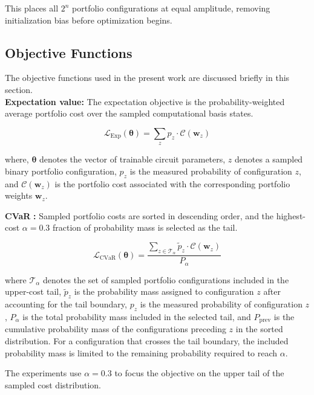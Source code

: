 \documentclass[runningheads]{llncs}
\begin{document}
This places all $2^n$ portfolio configurations at equal amplitude, removing initialization bias before optimization begins.

\subsection{Objective Functions}
The objective functions used in the present work are discussed briefly in this section.\\
\textbf{Expectation value:} The expectation objective is the probability-weighted average portfolio cost over the sampled computational basis states.

\begin{equation}
    \mathcal{L}_{\text{Exp}}(\boldsymbol{\theta}) = 
    \sum_{z} p_z \cdot \mathcal{C}(\mathbf{w}_z)
\end{equation}

where, $\boldsymbol{\theta}$ denotes the vector of trainable circuit parameters, $z$ denotes a sampled binary portfolio configuration, $p_z$ is the measured probability of configuration $z$, and $\mathcal{C}(\mathbf{w}_z)$ is the portfolio cost associated with the corresponding portfolio weights $\mathbf{w}_z$.

\textbf{CVaR} \cite{barkoutsos2020}\textbf{:} Sampled portfolio costs are sorted in descending order, and the highest-cost $\alpha = 0.3$ fraction of probability mass is selected as the tail.

\begin{equation}
    \mathcal{L}_{\text{CVaR}}(\boldsymbol{\theta}) = 
    \frac{\displaystyle\sum_{z \in \mathcal{T}_\alpha} 
    \tilde{p}_z \cdot \mathcal{C}(\mathbf{w}_z)}{P_\alpha}
\end{equation}

where $\mathcal{T}_\alpha$ denotes the set of sampled portfolio configurations included in the upper-cost tail, $\tilde{p}_z$ is the probability mass assigned to configuration $z$ after accounting for the tail boundary, $p_z$ is the measured probability of configuration $z$, $P_\alpha$ is the total probability mass included in the selected tail, and $P_{\mathrm{prev}}$ is the cumulative probability mass of the configurations preceding $z$ in the sorted distribution. For a configuration that crosses the tail boundary, the included probability mass is limited to the remaining probability required to reach $\alpha$.

The experiments use $\alpha=0.3$ to focus the objective on the upper tail of the sampled cost distribution.
\end{document}
